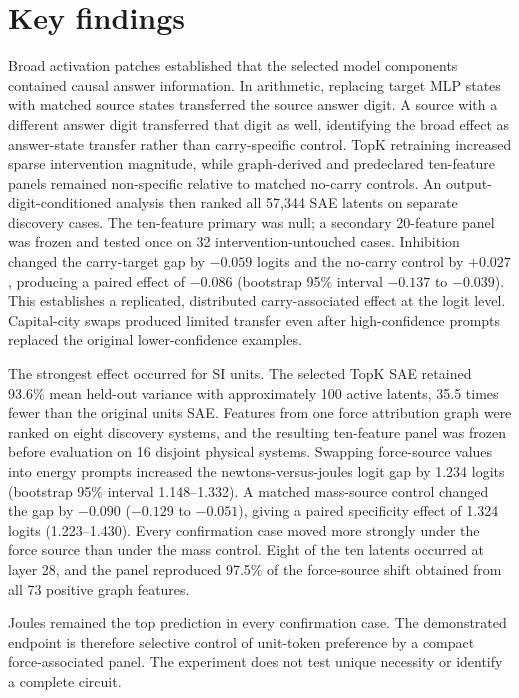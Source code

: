 \documentclass[11pt,a4paper]{article}
\begin{document}
\newpage
\section*{Key findings}

Broad activation patches established that the selected model components contained causal answer information. In arithmetic, replacing target MLP states with matched source states transferred the source answer digit. A source with a different answer digit transferred that digit as well, identifying the broad effect as answer-state transfer rather than carry-specific control. TopK retraining increased sparse intervention magnitude, while graph-derived and predeclared ten-feature panels remained non-specific relative to matched no-carry controls. An output-digit-conditioned analysis then ranked all 57,344 SAE latents on separate discovery cases. The ten-feature primary was null; a secondary 20-feature panel was frozen and tested once on 32 intervention-untouched cases. Inhibition changed the carry-target gap by $-0.059$ logits and the no-carry control by $+0.027$, producing a paired effect of $-0.086$ (bootstrap 95\% interval $-0.137$ to $-0.039$). This establishes a replicated, distributed carry-associated effect at the logit level. Capital-city swaps produced limited transfer even after high-confidence prompts replaced the original lower-confidence examples.

The strongest effect occurred for SI units. The selected TopK SAE retained 93.6\% mean held-out variance with approximately 100 active latents, 35.5 times fewer than the original units SAE. Features from one force attribution graph were ranked on eight discovery systems, and the resulting ten-feature panel was frozen before evaluation on 16 disjoint physical systems. Swapping force-source values into energy prompts increased the newtons-versus-joules logit gap by 1.234 logits (bootstrap 95\% interval 1.148--1.332). A matched mass-source control changed the gap by $-0.090$ ($-0.129$ to $-0.051$), giving a paired specificity effect of 1.324 logits (1.223--1.430). Every confirmation case moved more strongly under the force source than under the mass control. Eight of the ten latents occurred at layer 28, and the panel reproduced 97.5\% of the force-source shift obtained from all 73 positive graph features.

Joules remained the top prediction in every confirmation case. The demonstrated endpoint is therefore selective control of unit-token preference by a compact force-associated panel. The experiment does not test unique necessity or identify a complete circuit.
\end{document}
